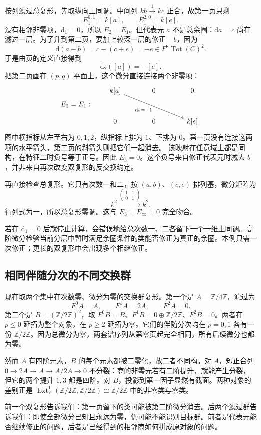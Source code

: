 \ProseParagraphBreak
按列滤过总复形，先取纵向上同调。中间列 \(kb\xrightarrow{1}kc\) 正合，故第一页只剩
\[
	E_1^{0,1}=k[a],\qquad E_1^{2,0}=k[e].
\]
没有相邻非零项，\(\mathrm{d}_1=0\)，所以 \(E_2=E_1\)。但代表元 \(a\) 不是总余圈：\(\mathrm{d}a=c\) 尚在滤过一层。为了升到第二页，要加上较深一层的修正 \(-b\)，因为
\[
	\mathrm{d}(a-b)=c-(c+e)=-e\in F^2\operatorname{Tot}(C)^2.
\]
于是由页的定义直接得到
\begin{equation}\label{b4:eq:nonzero-d2}
	\mathrm{d}_2([a])=-[e].
\end{equation}
把第二页画在 \((p,q)\) 平面上，这个微分直接连接两个非零项：
\[
	E_2=E_1:\qquad
	\begin{tikzcd}[column sep=large,row sep=large]
		k[a]\arrow[rrd,"{\mathrm{d}_2=-1}"'] & 0 & 0\\
		0 & 0 & k[e]
	\end{tikzcd}
\]
图中横指标从左至右为 \(0,1,2\)，纵指标上排为 \(1\)、下排为 \(0\)。第一页没有连接这两项的水平箭头，第二页的斜箭头则把它们一起消去。 该映射在任意域上都是同构，在特征二时负号等于正号。因此 \(E_3=0\)。这个负号来自修正代表元时减去 \(b\)，并非来自再次改变双复形的反交换约定。

\ProseParagraphBreak
再直接检查总复形。它只有次数一和二，按 \((a,b)\)、\((c,e)\) 排列基，微分矩阵为
\[
	k^2\xrightarrow{\left(\begin{smallmatrix}1&1\\0&1\end{smallmatrix}\right)}k^2.
\]
行列式为一，所以总复形零调。这与 \(E_3=E_\infty=0\) 完全吻合。

\ProseParagraphBreak
若在 \(\mathrm{d}_1=0\) 后就停止计算，会错误地给总次数一、二各留下一个一维上同调。高阶微分检验当前分层中暂时满足余圈条件的类能否修正为真正的余圈。本例只需一次修正；更长的双复形中会出现多个相继修正。

\subsection{相同伴随分次的不同交换群}
\label{b4:subsec:1405:02}

现在取两个集中在次数零、微分为零的交换群复形。第一个是 \(A=\mathbb Z/4\mathbb Z\)，滤过为
\[
	F^0A=A,\qquad F^1A=2A,\qquad F^2A=0.
\]
第二个是 \(B=(\mathbb Z/2\mathbb Z)^2\)，取 \(F^0B=B\)、\(F^1B=0\oplus\mathbb Z/2\mathbb Z\)、\(F^2B=0\)。两者在 \(p\le0\) 延拓为整个对象，在 \(p\ge2\) 延拓为零。它们的伴随分次均在 \(p=0,1\) 各有一份 \(\mathbb Z/2\mathbb Z\)。因为总微分为零，两套谱序列从第零页起完全相同，所有后续微分也都为零。

\ProseParagraphBreak
然而 \(A\) 有四阶元素，\(B\) 的每个元素都被二零化，故二者不同构。对 \(A\)，短正合列 \(0\to2A\to A\to A/2A\to0\) 不分裂：商的非零元若有二阶提升，就能产生分裂，但它的两个提升 \(\overline1,\overline3\) 都是四阶。对 \(B\)，投影到第一因子显然有截面。两种对象的差别正是 \(\operatorname{Ext}_{\mathbb Z}^1(\mathbb Z/2\mathbb Z,\mathbb Z/2\mathbb Z)\cong\mathbb Z/2\mathbb Z\) 中的非零类与零类。

\ProseParagraphBreak
前一个双复形告诉我们：第一页留下的类可能被第二阶微分消去。后两个滤过群告诉我们：即使全部微分已知且永远为零，仍可能不能识别目标群。前者是代表元能否继续修正的问题，后者是已经得到的相邻商如何拼成原对象的问题。
